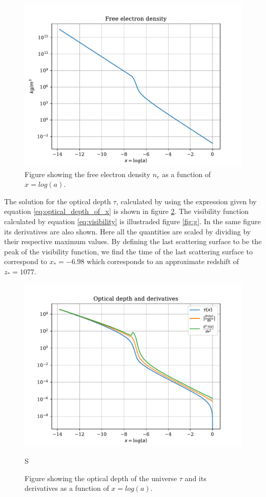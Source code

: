 \documentclass[onecolumn]{aastex62}
\begin{document}
\begin{figure}
    \includegraphics[scale=0.8]{figures/ne.pdf}
    \caption{Figure showing the free electron density $n_e$ as a function of $x=log(a)$.}
    \label{fig:ne}
\end{figure}
The solution for the optical depth $\tau$, calculated by using the expression given by equation \ref{eq:optical_depth_of_x} is shown in figure \ref{fig:tau}.
The visibility function calculated by equation \ref{eq:visibility} is illustraded figure \ref{fig:g}. In the same figure its derivatives are also shown. Here all the quantities are scaled by dividing by their respective maximum values.
By defining the last scattering surface to be the peak of the visibility function, we find the time of the last scattering surface to correspond to $x_*=-6.98$ which corresponds to an approximate redshift of $z_*=1077$.
\begin{figure}
    \includegraphics[scale=0.8]{figures/tau.pdf}
    \caption{Figure showing the optical depth of the universe $\tau$ and its derivatives as a function of $x=log(a)$.}S
    \label{fig:tau}
\end{figure}
\end{document}
